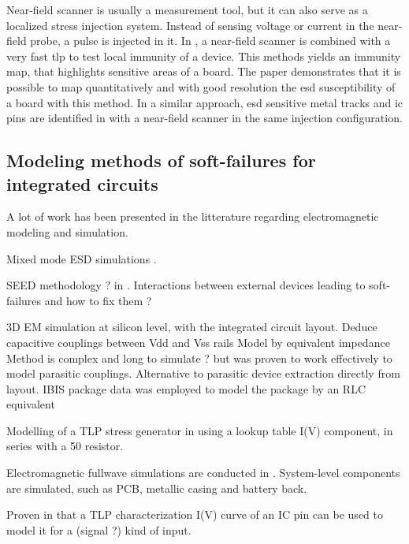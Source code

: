 Near-field scanner is usually a measurement tool, but it can also serve as a localized stress injection system.
Instead of sensing voltage or current in the near-field probe, a pulse is injected in it.
In \cite{NearFieldInjectionFabrice}, a near-field scanner is combined with a very fast \gls{tlp} to test local immunity of a device.
This methods yields an immunity map, that highlights sensitive areas of a board.
The paper demonstrates that it is possible to map quantitatively and with good resolution the \gls{esd} susceptibility of a board with this method.
In a similar approach, \gls{esd} sensitive metal tracks and \gls{ic} pins are identified in \cite{NearFieldInjectionBis} with a near-field scanner in the same injection configuration.


\subsection{Modeling methods of soft-failures for integrated circuits}

A lot of work has been presented in the litterature regarding electromagnetic modeling and simulation.

Mixed mode ESD simulations \cite{mixedModeESDSims}.

SEED methodology ? in \cite{usb2ESDProtection}.
Interactions between external devices leading to soft-failures and how to fix them ?

3D EM simulation \cite{LacrampeTransientImmunity} at silicon level, with the integrated circuit layout.
Deduce capacitive couplings between Vdd and Vss rails
Model by equivalent impedance
Method is complex and long to simulate ? but was proven to work effectively to model parasitic couplings.
Alternative to parasitic device extraction directly from layout.
IBIS package data was employed to model the package by an RLC equivalent

%
Modelling of a TLP stress generator in \cite{LacrampeTransientImmunity} using a lookup table I(V) component, in series with a 50\textOmega{} resistor.

Electromagnetic fullwave simulations are conducted in \cite{softFailMobile}.
System-level components are simulated, such as PCB, metallic casing and battery back.

Proven in \cite{usb2ESDProtection} that a TLP characterization I(V) curve of an IC pin can be used to model it for a (signal ?) kind of input.

